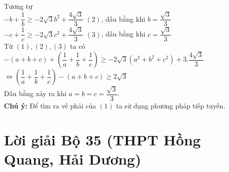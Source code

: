 Tương tự\\
$-b+\dfrac{1}{b}\ge -2\sqrt{3}b^2+\dfrac{4\sqrt{3}}{3}$ $(2)$, dấu bằng khi $b=\dfrac{\sqrt{3}}{3}$\\
$-c+\dfrac{1}{c}\ge -2\sqrt{3}c^2+\dfrac{4\sqrt{3}}{3}$ $(3)$, dấu bằng khi $c=\dfrac{\sqrt{3}}{3}$\\
Từ $(1),(2),(3)$ ta có\\
$-(a+b+c)+\left (\dfrac{1}{a}+\dfrac{1}{b}+\dfrac{1}{c}\right)\ge -2\sqrt{3}(a^2+b^2+c^2)+3.\dfrac{4\sqrt{3}}{3}$\\
$\iff \left (\dfrac{1}{a}+\dfrac{1}{b}+\dfrac{1}{c}\right)-(a+b+c)\ge 2\sqrt{3}$\\
Dấu bằng xảy ra khi $a=b=c=\dfrac{\sqrt{3}}{3}$.\\
\textbf{Chú ý:} Để tìm ra vế phải của $(1)$ ta sử dụng phương pháp tiếp tuyến.

\section{Lời giải Bộ 35 (THPT Hồng Quang, Hải Dương)}

\lgi 
\vspace{5cm}

